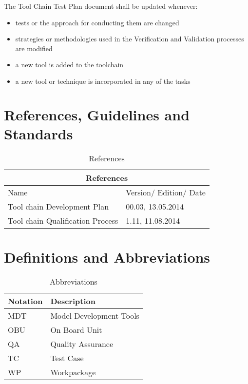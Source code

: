 The Tool Chain Test Plan document shall be updated whenever:
\begin{itemize}
\item tests or the approach for conducting them are changed
\item strategies or methodologies used in the Verification and Validation processes are modified
\item a new tool is added to the toolchain
\item a new tool or technique is incorporated in any of the tasks 
\end{itemize}

\section{References, Guidelines and Standards}

\begin{table}[htbp]
\begin{tabular}{|m{}|m{4cm}|}
\hline
\multicolumn{2}{|c|}{\textbf{References}} \\\hline
Name &
Version/ Edition/ Date
\\\hline
Tool chain Development Plan & 00.03, 13.05.2014
\\\hline
Tool chain Qualification Process & 1.11, 11.08.2014
 \\\hline
\end{tabular}
\caption{References}
\end{table}

\section{Definitions and Abbreviations}

\begin{table}[htbp]
\begin{tabular}{|m{3cm}|m{8cm}|}
\hline
\textbf{Notation} &
\textbf{Description} 
\\\hline
MDT & Model Development Tools
 \\\hline
OBU & On Board Unit
\\\hline
QA & Quality Assurance
\\\hline
TC & Test Case
\\\hline
WP & Workpackage
\\\hline
\end{tabular}
\caption{Abbreviations}
\end{table}
